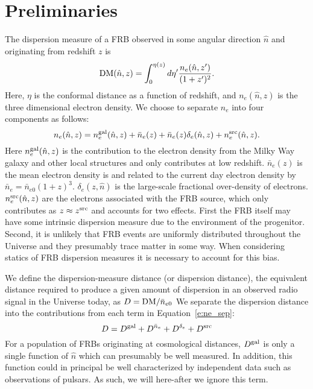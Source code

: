 \documentclass[onecolumn,prd,noshowpacs,nofootinbib,amsmath,amssymb]{revtex4}
\newcommand{\Dgal}{D^{\rm gal}}
\newcommand{\Dne}{D^{\bar{n}_e}}
\newcommand{\Dde}{D^{\delta_e}}
\newcommand{\Dsrc}{D^{\rm src}}
\begin{document}
\section{Preliminaries}



The dispersion measure of a FRB observed in some angular direction $\hat{n}$ and
originating from redshift $z$ is
\begin{equation}
    {\rm DM}(\hat{n}, z) = \int_0^{\eta(z)} d\eta'
        \frac{n_e(\hat{n}, z')}{(1+z')^2}.
\end{equation}
Here, $\eta$ is the conformal distance as a function of redshift, and
$n_e(\hat{n}, z)$ is the three dimensional electron density.  We choose to
separate $n_e$ into four components as follows:
\begin{equation}
\label{e:ne_sep}
n_e(\hat{n}, z) = n_e^{\rm gal}(\hat{n}, z) + \bar{n}_e(z) +
    \bar{n}_e(z)\delta_e(\hat{n}, z) + n_e^{\rm src}(\hat{n}, z).
\end{equation}
Here $n_e^{\rm gal}(\hat{n}, z)$ is the contribution to the electron density
from the Milky Way galaxy and other local structures and only contributes at
low redshift. $\bar{n}_e(z)$ is the mean electron density is and related to the
current day electron density by $\bar{n}_e = \bar{n}_{e0} (1+z)^3$. 
$\delta_e(z,\hat{n})$ is the large-scale fractional over-density of electrons.
$n_e^{\rm src}(\hat{n}, z)$ are the electrons associated with the FRB source,
which only contributes as $z \approx z^{\rm src}$ and accounts for two effects.
First the FRB itself
may have some intrinsic dispersion measure due to the environment of the
progenitor.  Second, it is unlikely that FRB events are uniformly distributed
throughout the Universe and they presumably trace matter in some way. When
considering statics of FRB dispersion measures it is necessary to account for
this bias.

We define the dispersion-measure distance (or dispersion distance),
the equivalent distance required to
produce a given amount of dispersion in an observed radio signal in the
Universe today, as $ D = {{\rm DM}}/{\bar{n}_{e0}}$
We separate the dispersion distance into the contributions from each
term in Equation~\ref{e:ne_sep}:
\begin{equation}
\label{e:D_sep}
D = \Dgal + \Dne + \Dde + \Dsrc
\end{equation}
For a population of FRBs originating at cosmological distances, $\Dgal$
is only a single function of $\hat{n}$ which can presumably be well
measured.  In addition, this function could in principal be well characterized
by independent data such as observations of pulsars.  As such, we will
here-after we ignore this term.
\end{document}
